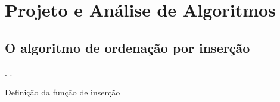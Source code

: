 \section{Projeto e Análise de Algoritmos}



\subsection{O algoritmo de ordenação por inserção}



\begin{coqdoccode}
\coqdocemptyline
\coqdocnoindent
{}  .\coqdoceol
\coqdocnoindent
{}  .\coqdoceol
\coqdocemptyline
\end{coqdoccode}
   Definição da função de inserção


